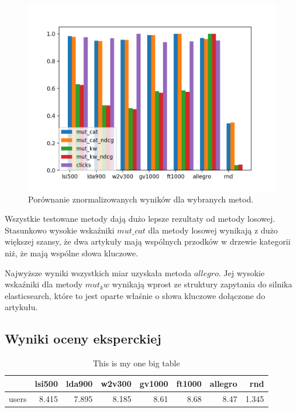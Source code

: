 \documentclass[pl]{minipw} %
\begin{document}
\begin{figure}[H]
	\centering
	\includegraphics[width=1\textwidth]{img/results/lsi500_lda900_w2v300_gv1000_ft1000_allegro_rnd_.png}
	\caption{Porównanie znormalizowanych wyników dla wybranych metod.}
\end{figure}

Wszystkie testowane metody dają dużo lepsze rezultaty od metody losowej. Stasunkowo wysokie wskaźniki $mut\_cat$ dla metody losowej wynikają z dużo większej szansy, że dwa artykuły mają wspólnych przodków w drzewie kategorii niż, że mają wspólne słowa kluczowe.

Najwyższe wyniki wszystkich miar uzyskała metoda $allegro$. Jej wysokie wskaźniki dla metody $mut_kw$ wynikają wprost ze struktury zapytania do silnika elasticsearch, które to jest oparte właśnie o słowa kluczowe dołączone do artykułu.

\subsection{Wyniki oceny eksperckiej}

\begin{table}
	\centering
	\begin{tabular}{lrrrrrrr}
		\hline
		&   lsi500 &   lda900 &   w2v300 &   gv1000 &   ft1000 &   allegro &   rnd \\
		\hline
		users &    8.415 &    7.895 &    8.185 &     8.61 &     8.68 &      8.47 & 1.345 \\
		\hline
	\end{tabular}
	\caption{This is my one big table}
\end{table}
\end{document}
